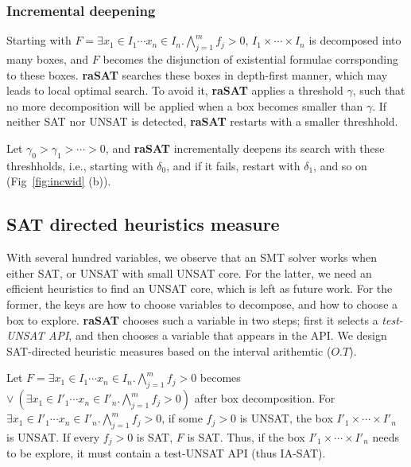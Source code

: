 \documentclass[runningheads,a4paper,oribibl]{llncs}
\begin{document}
\subsubsection*{Incremental deepening}

Starting with $F = \exists x_1 \in I_1 \cdots x_n \in I_n. \bigwedge \limits_{j=1}^m f_j > 0$, 
$I_1 \times \cdots \times I_n$ is decomposed into many boxes, 
and $F$ becomes the disjunction of existential formulae corrsponding to these boxes. 
{\bf raSAT} searches these boxes in depth-first manner, which may leads to local optimal search. 
To avoid it, {\bf raSAT} applies a threshold $\gamma$, such that no more decomposition will be 
applied when a box becomes smaller than $\gamma$. 
If neither SAT nor UNSAT is detected, {\bf raSAT} restarts with a smaller threshhold. 

Let $\gamma_0 > \gamma_1 > \cdots > 0$, and {\bf raSAT} incrementally deepens its search 
with these threshholds, i.e., starting with $\delta_0$, and if it fails, restart with $\delta_1$, 
and so on (Fig~\ref{fig:incwid} (b)). 



\subsection{SAT directed heuristics measure} \label{sec:SATheuristics}

With several hundred variables, we observe that an SMT solver works 
when either SAT, or UNSAT with small UNSAT core.
%
For the latter, we need an efficient heuristics to find an UNSAT core, which is left as future work. 
For the former, the keys are how to choose variables to decompose, and 
how to choose a box to explore. 
{\bf raSAT} chooses such a variable in two steps; first it selects a {\em test-UNSAT API}, and
then chooses a variable that appears in the API. 
We design SAT-directed heuristic measures based on the interval arithemtic ($O.T$). 

Let $F = \exists x_1 \in I_1 \cdots x_n \in I_n. \bigwedge \limits_{j=1}^m f_j > 0$ 
becomes $\vee~( \exists x_1 \in I'_1 \cdots x_n \in I'_n. \bigwedge \limits_{j=1}^m f_j > 0)$ 
after box decomposition. 
For $\exists x_1 \in I'_1 \cdots x_n \in I'_n. \bigwedge \limits_{j=1}^m f_j > 0$, 
if some $f_j > 0$ is UNSAT, the box $I'_1 \times \cdots \times I'_n$ is UNSAT. 
If every $f_j > 0$ is SAT, $F$ is SAT. 
Thus, if the box $I'_1 \times \cdots \times I'_n$ needs to be explore, it must contain 
a test-UNSAT API (thus IA-SAT). 
\end{document}
